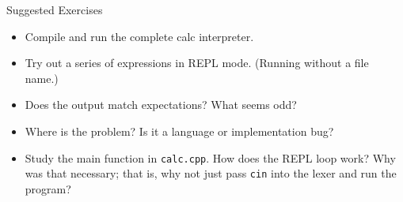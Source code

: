 \documentclass[handout]{beamer}
\newenvironment{code}{%
 \VerbatimEnvironment
 \begin{adjustbox}{max width=\textwidth, max height=0.7\textheight}
 \begin{BVerbatim}
  }{
  \end{BVerbatim}
 \end{adjustbox}
}
\begin{document}

\begin{frame}{Suggested Exercises}
    \begin{itemize}
        \item Compile and run the complete calc interpreter.
        \item Try out a series of expressions in REPL mode. (Running without a file name.)
        \item Does the output match expectations? What seems odd?
        \item Where is the problem? Is it a language or implementation bug?
        \item Study the main function in \texttt{calc.cpp}. How does the REPL loop work? Why was that necessary; that is, why not just pass \texttt{cin} into the lexer and run the program?
    \end{itemize}
\end{frame}
\end{document}
